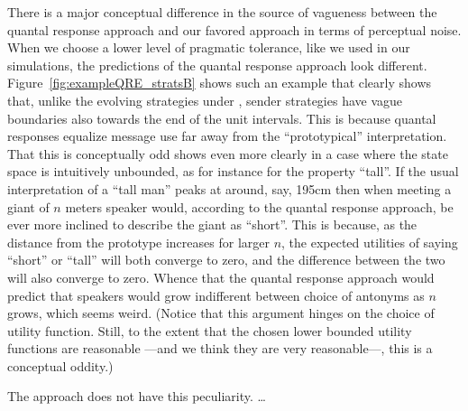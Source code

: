 There is a major conceptual difference in the source of vagueness
between the quantal response approach and our favored approach in
terms of perceptual noise. When we choose a lower level of pragmatic
tolerance, like we used in our simulations, the predictions of the
quantal response approach look
different. Figure~\ref{fig:exampleQRE_stratsB} shows such an example
that clearly shows that, unlike the evolving strategies under \rdd,
sender strategies have vague boundaries also towards the end of the
unit intervals. This is because quantal responses equalize message use
far away from the ``prototypical'' interpretation. That this is
conceptually odd shows even more clearly in a case where the state
space is intuitively unbounded, as for instance for the property
``tall''. If the usual interpretation of a ``tall man'' peaks at
around, say, 195cm then when meeting a giant of $n$ meters speaker
would, according to the quantal response approach, be ever more
inclined to describe the giant as ``short''. This is because, as the
distance from the prototype increases for larger $n$, the expected
utilities of saying ``short'' or ``tall'' will both converge to zero,
and the difference between the two will also converge to zero. Whence
that the quantal response approach would predict that speakers would
grow indifferent between choice of antonyms as $n$ grows, which seems
weird. (Notice that this argument hinges on the choice of utility
function. Still, to the extent that the chosen lower bounded utility
functions are reasonable ---and we think they are very reasonable---,
this is a conceptual oddity.)

The \rdd approach does not have this peculiarity. \dots



